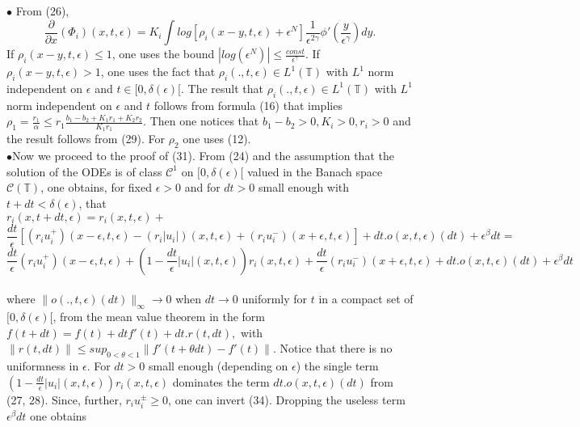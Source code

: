 \documentclass[a4paper,12pt]{article}
\begin{document}
   $\bullet$ From (26),
  $$\frac{\partial}{\partial x}(\Phi_i)(x,t,\epsilon)=K_i\int log[\rho_i(x-y,t,\epsilon)+\epsilon^N]\frac{1}{\epsilon^{2\gamma}}  \phi'(\frac{y}{\epsilon^\gamma})dy.$$
If $\rho_i(x-y,t,\epsilon)\leq 1$, one uses the bound $|log(\epsilon^N)|\leq \frac{const}{\epsilon^\gamma}.$
If $\rho_i(x-y,t,\epsilon)> 1$, one uses the fact that  $\rho_i(.,t,\epsilon)\in L^1(\mathbb{T})$ with $L^1$ norm independent on $\epsilon$ and $t\in[0,\delta(\epsilon)[$. The result that $\rho_i(.,t,\epsilon)\in  L^1(\mathbb{T})$ with $L^1$ norm independent on $\epsilon$ and $t$ follows from formula (16) that implies $\rho_1=\frac{r_1}{\alpha}\leq r_1\frac{b_1-b_2+K_1r_1+K_2r_2}{K_1r_1}$. Then  one notices that  $b_1-b_2>0, K_i>0,r_i>0$ and the result follows from (29). For $\rho_2$ one uses (12). \\ 

 $\bullet$Now we proceed to the proof of (31). 
 From (24) and the assumption that the solution of the ODEs  is of class $\mathcal{C}^1$ on $[0,\delta(\epsilon)[$ valued in the Banach space $\mathcal{C}(\mathbb{T})$, one obtains, for fixed $\epsilon>0$ and for $dt>0$ small enough with $t+dt<\delta(\epsilon)$, that\\

     $r_i(x,t+dt,\epsilon)=r_i(x,t,\epsilon)+$\\
     $$\frac{dt}{\epsilon}[(r_i u_i^+)(x-\epsilon,t,\epsilon)-(r_i |u_i|)(x,t,\epsilon)+(r_i u_i^-)(x+\epsilon,t,\epsilon)]+dt.o(x,t,\epsilon)(dt)+\epsilon^\beta dt=$$ \begin{equation}\frac{dt}{\epsilon}(r_i u_i^+)(x-\epsilon,t,\epsilon)+(1-\frac{dt}{\epsilon}|u_i|(x,t,\epsilon))r_i(x,t,\epsilon)+\frac{dt}{\epsilon}(r_i u_i^-)(x+\epsilon,t,\epsilon)+dt.o(x,t,\epsilon)(dt)+\epsilon^\beta dt\end{equation}
     \\ 
      where $\|o(.,t,\epsilon)(dt)\|_\infty \rightarrow 0$ when $dt\rightarrow 0$ uniformly for $t$ in a compact set of $[0,\delta(\epsilon)[$, from the mean value theorem in the form $f(t+dt)=f(t)+dt f'(t) +dt.  r(t,dt),$ with $ \|r(t,dt)\|\leq sup_{0<\theta<1}\|f'(t+\theta dt)-f'(t)\|$. Notice that there is no uniformness in $\epsilon$. For $dt>0$ small enough (depending on $\epsilon$)   the single term $  (1-\frac{dt}{\epsilon}|u_i|(x,t,\epsilon))r_i(x,t,\epsilon)$ dominates the term $dt.o(x,t,\epsilon)(dt)$ from (27, 28). Since, further, $r_i u_i^\pm\geq0$, one can invert (34). Dropping  the useless term $\epsilon^\beta dt$ one obtains\\
 
\end{document}
